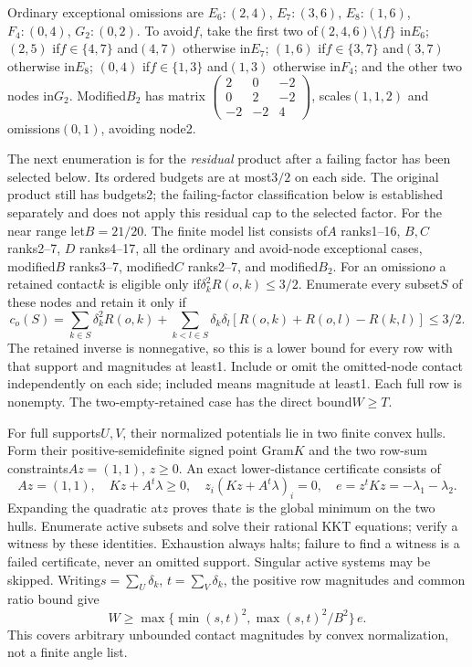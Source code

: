 \documentclass[11pt]{article}
\theoremstyle{remark}\newtheorem{remark}[theorem]{Remark}
\begin{document}
Ordinary exceptional omissions are
$E_6:(2,4)$, $E_7:(3,6)$, $E_8:(1,6)$,
$F_4:(0,4)$, $G_2:(0,2)$. To avoid$f$, take the first two
of$(2,4,6)\setminus\{f\}$ in$E_6$;
$(2,5)$ if$f\in\{4,7\}$ and$(4,7)$ otherwise in$E_7$;
$(1,6)$ if$f\in\{3,7\}$ and$(3,7)$ otherwise in$E_8$;
$(0,4)$ if$f\in\{1,3\}$ and$(1,3)$ otherwise in$F_4$;
and the other two nodes in$G_2$.
Modified$B_2$ has matrix
$\left(\begin{smallmatrix}2&0&-2\\0&2&-2\\-2&-2&4\end{smallmatrix}\right)$,
scales$(1,1,2)$ and omissions$(0,1)$, avoiding node2.

The next enumeration is for the \emph{residual} product after a
failing factor has been selected below. Its ordered
budgets are at most$3/2$ on each side. The original product still
has budgets2; the failing-factor classification below is established
separately and does not apply this residual cap to the selected factor.
For the near range let$B=21/20$. The finite model list consists
of$A$ ranks1--16, $B,C$ ranks2--7, $D$ ranks4--17, all the
ordinary and avoid-node exceptional cases, modified$B$ ranks3--7,
modified$C$ ranks2--7, and modified$B_2$. For an omission$o$ a
retained contact$k$ is eligible only if$\delta_k^2R(o,k)\le3/2$.
Enumerate every subset$S$ of these nodes and retain it only if
\begin{equation}\label{eq:tail-support-cost}
 c_o(S)=\sum_{k\in S}\delta_k^2R(o,k)
 +\sum_{k<l\in S}\delta_k\delta_l
       [R(o,k)+R(o,l)-R(k,l)]\le3/2 .
\end{equation}
The retained inverse is nonnegative, so this is a lower bound for
every row with that support and magnitudes at least1.
Include or omit the omitted-node contact independently on each
side; included means magnitude at least1. Each full row is nonempty.
The two-empty-retained case has the direct bound$W\ge T$.

For full supports$U,V$, their normalized potentials lie in two
finite convex hulls. Form their positive-semidefinite signed
point Gram$K$ and the two row-sum constraints$Az=(1,1)$, $z\ge0$.
An exact lower-distance certificate consists of
\[
 Az=(1,1),\quad Kz+A^t\lambda\ge0,\quad
 z_i(Kz+A^t\lambda)_i=0,\quad
 e=z^tKz=-\lambda_1-\lambda_2.
\]
Expanding the quadratic at$z$ proves that$e$ is the global minimum
on the two hulls. Enumerate active subsets and solve their rational
KKT equations; verify a witness by these identities. Exhaustion
always halts; failure to find a witness is a failed certificate,
never an omitted support. Singular active systems may be skipped.
Writing$s=\sum_U\delta_k$, $t=\sum_V\delta_k$, the positive row
magnitudes and common ratio bound give
\begin{equation}\label{eq:height-envelope}
 W\ge \max\{\min(s,t)^2,\max(s,t)^2/B^2\}\,e .
\end{equation}
This covers arbitrary unbounded contact magnitudes by convex
normalization, not a finite angle list.
\end{document}
